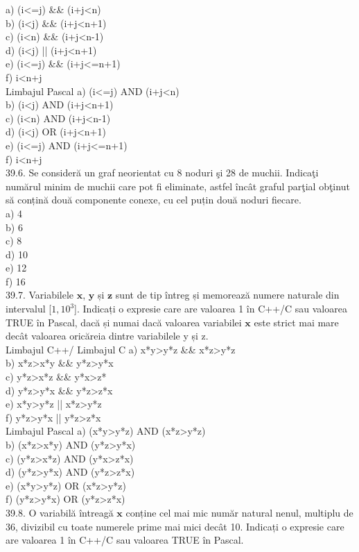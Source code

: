 \begin{itemize}
\begin{enumerate}
a) (i<=j) \&\& (i+j<n)
\\
b) (i<j) \&\& (i+j<n+1)
\\
c) (i<n) \&\& (i+j<n-1)
\\
d) (i<j) || (i+j<n+1)
\\
e) (i<=j) \&\& (i+j<=n+1)
\\
f) i<n+j
\\
Limbajul Pascal
a) (i<=j) AND (i+j<n)
\\
b) (i<j) AND (i+j<n+1)
\\
c) (i<n) AND (i+j<n-1)
\\
d) (i<j) OR (i+j<n+1)
\\
e) (i<=j) AND (i+j<=n+1)
\\
f) i<n+j
\\
39.6. Se consideră un graf neorientat cu 8 noduri şi 28 de muchii. Indicaţi numărul minim de muchii care pot fi eliminate, astfel încât graful parţial obţinut să conțină două componente conexe, cu cel puțin două noduri fiecare.
\\
a) 4
\\
b) 6
\\
c) 8
\\
d) 10
\\
e) 12
\\
f) 16
\\
39.7. Variabilele $\mathbf{x}$, $\mathbf{y}$ și $\mathbf{z}$ sunt de tip întreg și memorează numere naturale din intervalul [$1, 10^{3}$]. Indicați o expresie care are valoarea 1 în C++/C sau valoarea TRUE în Pascal, dacă și numai dacă valoarea variabilei $\mathbf{x}$ este strict mai mare decât valoarea oricăreia dintre variabilele y și z.
\\
Limbajul C++/ Limbajul C
a) x*y>y*z \&\& x*z>y*z
\\
b) x*z>x*y \&\& y*z>y*x
\\
c) y*z>x*z \&\& y*x>z*
\\
d) y*z>y*x \&\& y*z>z*x
\\
e) x*y>y*z || x*z>y*z
\\
f) y*z>y*x || y*z>z*x
\\
Limbajul Pascal
a) (x*y>y*z) AND (x*z>y*z)
\\
b) (x*z>x*y) AND (y*z>y*x)
\\
c) (y*z>x*z) AND (y*x>z*x)
\\
d) (y*z>y*x) AND (y*z>z*x)
\\
e) (x*y>y*z) OR (x*z>y*z)
\\
f) (y*z>y*x) OR (y*z>z*x)
\\
39.8. O variabilă întreagă $\mathbf{x}$ conține cel mai mic număr natural nenul, multiplu de 36, divizibil cu toate numerele prime mai mici decât 10. Indicați o expresie care are valoarea 1 în C++/C sau valoarea TRUE în Pascal.

\end{enumerate}
\end{itemize}

